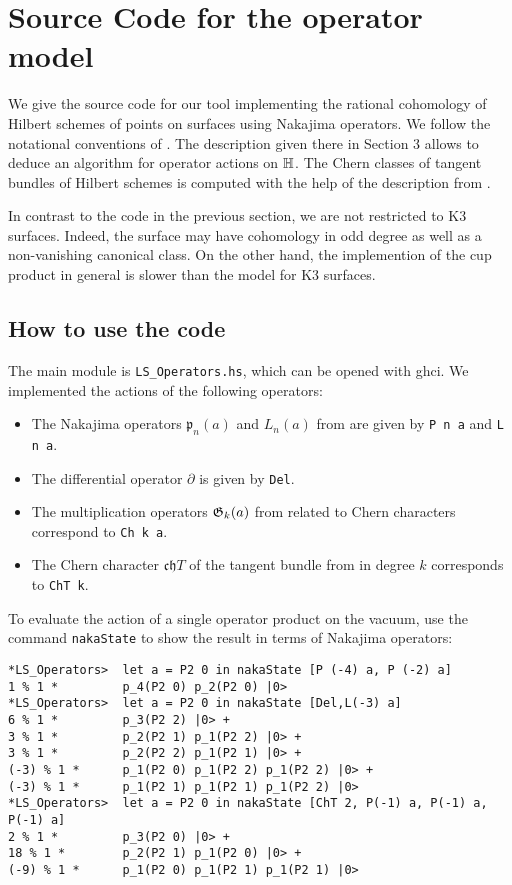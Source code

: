 
\section{Source Code for the operator model}
We give the source code for our tool implementing the rational cohomology of Hilbert schemes of points on surfaces using Nakajima operators. 
We follow the notational conventions of \cite{LehnSorger}. The description given there in Section 3 allows to deduce an algorithm for operator actions on $\mathbb{H}$. The Chern classes of  tangent bundles of Hilbert schemes is computed with the help of the description from \cite[Section 3]{Boissiere}.

In contrast to the code in the previous section, we are not restricted to K3 surfaces. Indeed, the surface may have cohomology in odd degree as well as a non-vanishing canonical class. On the other hand, the implemention of the cup product in general is slower than the model for K3 surfaces. 

\subsection{How to use the code}
The main module is \verb|LS_Operators.hs|, which can be opened with ghci.
We implemented the actions of the following operators:
\begin{itemize}
 \item The Nakajima operators $\mathfrak p_n(a)$ and $L_n(a)$ from \cite{LehnSorger} are given by \verb|P n a| and \verb|L n a|. 
 \item The differential operator $\partial$ is given by \verb|Del|.
 \item The multiplication operators $\mathfrak{G}_k(a)$ from \cite{LiQinWang} related to Chern characters correspond to \verb|Ch k a|.
 \item The Chern character $\mathfrak{ch}T$ of the tangent bundle from \cite{Boissiere} in degree $k$ corresponds to \verb|ChT k|.
\end{itemize}
\begin{example}
To evaluate the action of a single operator product on the vacuum, use the command \verb|nakaState| to show the result in terms of Nakajima operators:
\begin{verbatim}
*LS_Operators>  let a = P2 0 in nakaState [P (-4) a, P (-2) a]
1 % 1 *         p_4(P2 0) p_2(P2 0) |0>
*LS_Operators>  let a = P2 0 in nakaState [Del,L(-3) a]
6 % 1 *         p_3(P2 2) |0> +
3 % 1 *         p_2(P2 1) p_1(P2 2) |0> +
3 % 1 *         p_2(P2 2) p_1(P2 1) |0> +
(-3) % 1 *      p_1(P2 0) p_1(P2 2) p_1(P2 2) |0> +
(-3) % 1 *      p_1(P2 1) p_1(P2 1) p_1(P2 2) |0>
*LS_Operators>  let a = P2 0 in nakaState [ChT 2, P(-1) a, P(-1) a, P(-1) a]
2 % 1 *         p_3(P2 0) |0> +
18 % 1 *        p_2(P2 1) p_1(P2 0) |0> +
(-9) % 1 *      p_1(P2 0) p_1(P2 1) p_1(P2 1) |0>
\end{verbatim}
\end{example}

